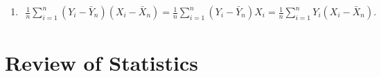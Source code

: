 \documentclass[11pt]{article}
\begin{document}
\begin{enumerate}
\begin{enumerate}
	\item \begin{eqnarray*}
		\frac{1}{n}\sum_{i=1}^{n}\left( Y_{i}-\bar{Y}%
		_{n}\right) \left( X_{i}-\bar{X}_{n}\right) =\frac{1}{n}\sum_{i=1}^{n}\left( Y_{i}-\bar{Y}%
		_{n}\right) X_{i}=\frac{1}{n}\sum_{i=1}^{n}  Y_{i}\left( X_{i}-\bar{X}_{n}\right).
	\end{eqnarray*}
	\end{enumerate}


\section*{Review of Statistics}


\end{enumerate}
\end{document}

